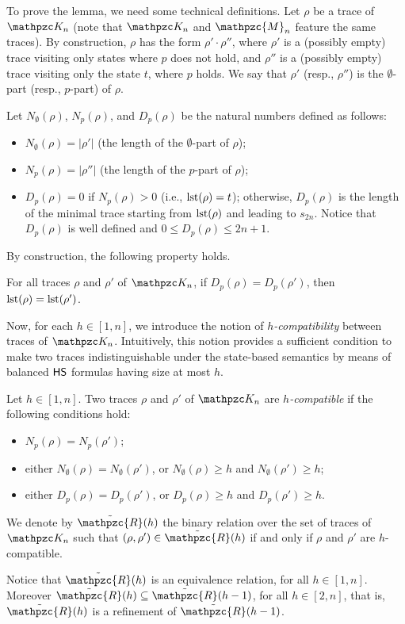 To prove the lemma, we need some technical definitions. 
Let $\rho$ be a trace of $\Ku_n$ (note that $\Ku_n$ and $\mathpzc{M}_n$ feature the same traces).
By construction, $\rho$ has the form $\rho'\cdot \rho''$, where $\rho'$ is a (possibly empty) trace visiting only states where $p$ does not hold, and $\rho''$
is a (possibly empty) trace visiting only the state $t$, where $p$ holds. We say that $\rho'$ (resp., $\rho''$) is the $\emptyset$-part (resp., $p$-part) of $\rho$.

Let $N_\emptyset(\rho)$, $N_p(\rho)$, and $D_p(\rho)$ be the natural numbers defined as follows:
\begin{itemize}
  \item $N_\emptyset(\rho) = |\rho'|$ (the length of the $\emptyset$-part of $\rho$);
  \item $N_p(\rho) = |\rho''|$ (the length of the $p$-part of $\rho$);
  \item $D_p(\rho)=0$ if $N_p(\rho)>0$ (i.e., $\operatorname{lst}(\rho)=t$); otherwise, $D_p(\rho)$ is the length of the minimal trace starting from  $\operatorname{lst}(\rho)$ and leading to
  $s_{2n}$. Notice that $D_p(\rho)$ is well defined and $0\leq D_p(\rho)\leq 2n+1$.
\end{itemize}

By construction, the following property holds.

\begin{proposition}\label{remark:HcompatibilityOne} For all traces $\rho$ and $\rho'$ of $\Ku_n$, if $D_p(\rho)= D_p(\rho')$, then $\operatorname{lst}(\rho)=\operatorname{lst}(\rho')$.
\end{proposition}

Now, for each $h\in [1,n]$, we introduce the notion of \emph{$h$-compatibility} between traces of  $\Ku_n$. Intuitively, this notion provides a sufficient condition to make two traces indistinguishable under the state-based semantics by means of balanced $\text{\sffamily HS}$ formulas having size at most $h$.

\begin{definition}[$h$-compatibility] Let $h\in [1,n]$. Two traces $\rho$ and $\rho'$ of $\Ku_n$ are \emph{$h$-compatible} if the following conditions hold:
\begin{itemize}
\item $N_p(\rho) = N_p(\rho')$;
  \item either $N_\emptyset(\rho) = N_\emptyset(\rho')$, or $N_\emptyset(\rho)\geq h$ and $N_\emptyset(\rho')\geq h$;
        \item either $D_p(\rho) = D_p(\rho')$, or $D_p(\rho)\geq h$ and $D_p(\rho')\geq h$.
\end{itemize}
We denote by $\tilde{\mathpzc{R}}(h)$ the binary relation over the set of traces of $\Ku_n$ such that $(\rho,\rho')\in \tilde{\mathpzc{R}}(h)$ if and only if $\rho$ and $\rho'$ are $h$-compatible. 

Notice that $\tilde{\mathpzc{R}}(h)$ is an equivalence relation, for all $h\in [1,n]$.
Moreover $\tilde{\mathpzc{R}}(h)\subseteq \tilde{\mathpzc{R}}(h-1)$, for all $h\in [2,n]$, that is, $\tilde{\mathpzc{R}}(h)$ is a refinement of $\tilde{\mathpzc{R}}(h-1)$.
\end{definition}

